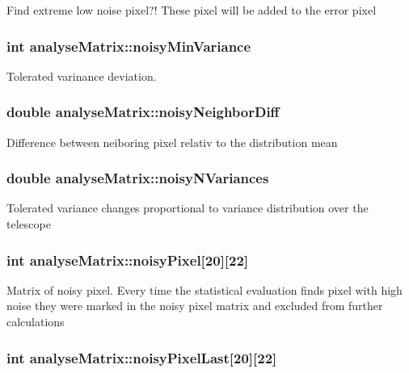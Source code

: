 Find extreme low noise pixel?! These pixel will be added to the error pixel \hypertarget{classanalyseMatrix_adb3542dfa480b47bdc51442a1980821a}{
\subsubsection[{noisy\-Min\-Variance}]{\setlength{\rightskip}{0pt plus 5cm}int analyse\-Matrix\-::noisy\-Min\-Variance}}\label{classanalyseMatrix_adb3542dfa480b47bdc51442a1980821a}
Tolerated varinance deviation. \hypertarget{classanalyseMatrix_a8a8c6af9d824a68930c5307517e050f5}{
\subsubsection[{noisy\-Neighbor\-Diff}]{\setlength{\rightskip}{0pt plus 5cm}double analyse\-Matrix\-::noisy\-Neighbor\-Diff}}\label{classanalyseMatrix_a8a8c6af9d824a68930c5307517e050f5}
Difference between neiboring pixel relativ to the distribution mean \hypertarget{classanalyseMatrix_a1e35cc039abe9757861c13ad48b73134}{
\subsubsection[{noisy\-N\-Variances}]{\setlength{\rightskip}{0pt plus 5cm}double analyse\-Matrix\-::noisy\-N\-Variances}}\label{classanalyseMatrix_a1e35cc039abe9757861c13ad48b73134}
Tolerated variance changes proportional to variance distribution over the telescope \hypertarget{classanalyseMatrix_a7309694bc069cc545ddb80de2cf96cb8}{
\subsubsection[{noisy\-Pixel}]{\setlength{\rightskip}{0pt plus 5cm}int analyse\-Matrix\-::noisy\-Pixel\mbox{[}20\mbox{]}\mbox{[}22\mbox{]}}}\label{classanalyseMatrix_a7309694bc069cc545ddb80de2cf96cb8}
Matrix of noisy pixel. Every time the statistical evaluation finds pixel with high noise they were marked in the noisy pixel matrix and excluded from further calculations \hypertarget{classanalyseMatrix_ae1a917330c3aa0e9ee6446d14f31eed3}{
\subsubsection[{noisy\-Pixel\-Last}]{\setlength{\rightskip}{0pt plus 5cm}int analyse\-Matrix\-::noisy\-Pixel\-Last\mbox{[}20\mbox{]}\mbox{[}22\mbox{]}}}\label{classanalyseMatrix_ae1a917330c3aa0e9ee6446d14f31eed3}
